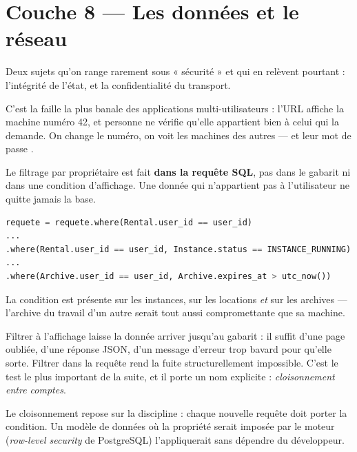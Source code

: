 \chapter{Couche 8 — Les données et le réseau}

Deux sujets qu'on range rarement sous « sécurité » et qui en relèvent
pourtant : l'intégrité de l'état, et la confidentialité du transport.


\menace
C'est la faille la plus banale des applications multi-utilisateurs : l'URL
 affiche la machine numéro 42, et personne ne vérifie
qu'elle appartient bien à celui qui la demande. On change le numéro, on voit
les machines des autres --- et leur mot de passe .

\parade
Le filtrage par propriétaire est fait \textbf{dans la requête SQL}, pas dans le
gabarit ni dans une condition d'affichage. Une donnée qui n'appartient pas à
l'utilisateur ne quitte jamais la base.

\danslecode
\begin{lstlisting}[language=Python]
requete = requete.where(Rental.user_id == user_id)
...
.where(Rental.user_id == user_id, Instance.status == INSTANCE_RUNNING)
...
.where(Archive.user_id == user_id, Archive.expires_at > utc_now())
\end{lstlisting}

La condition est présente sur les instances, sur les locations \emph{et} sur
les archives --- l'archive du travail d'un autre serait tout aussi
compromettante que sa machine.

\begin{retenir}
Filtrer à l'affichage laisse la donnée arriver jusqu'au gabarit : il suffit
d'une page oubliée, d'une réponse JSON, d'un message d'erreur trop bavard pour
qu'elle sorte. Filtrer dans la requête rend la fuite structurellement
impossible. C'est le test le plus important de la suite, et il porte un nom
explicite : \emph{cloisonnement entre comptes}.
\end{retenir}

\limite
Le cloisonnement repose sur la discipline : chaque nouvelle requête doit porter
la condition. Un modèle de données où la propriété serait imposée par le moteur
(\emph{row-level security} de PostgreSQL) l'appliquerait sans dépendre du
développeur.

